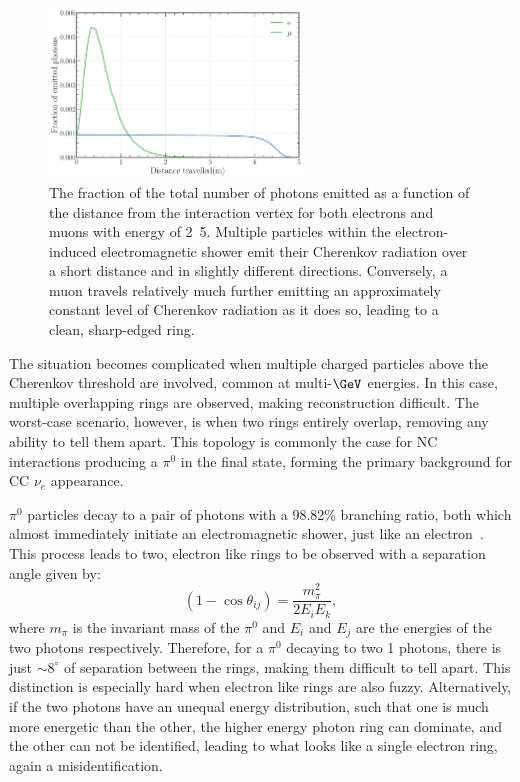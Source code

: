 \begin{figure} %
    \includegraphics[width=0.6\textwidth]{diagrams/4-chips/emission_distance.pdf}
    \caption[Fraction of Cherenkov photons emitted as a function of distance]
    {The fraction of the total number of photons emitted as a function of the distance from the
        interaction vertex for both electrons and muons with energy of \unit{2.5}{\GeV}. Multiple
        particles within the electron-induced electromagnetic shower emit their Cherenkov
        radiation over a short distance and in slightly different directions. Conversely, a muon
        travels relatively much further emitting an approximately constant level of Cherenkov
        radiation as it does so, leading to a clean, sharp-edged ring.}
    \label{fig:emission distance}
\end{figure}

The situation becomes complicated when multiple charged particles above the Cherenkov threshold
are involved, common at multi-$\GeV$ energies. In this case, multiple overlapping rings are
observed, making reconstruction difficult. The worst-case scenario, however, is when two rings
entirely overlap, removing any ability to tell them apart. This topology is commonly the case for
NC interactions producing a $\pi^{0}$ in the final state, forming the primary background for CC
$\nu_{e}$ appearance.

$\pi^{0}$ particles decay to a pair of photons with a 98.82\% branching ratio, both which almost
immediately initiate an electromagnetic shower, just like an electron~\cite{particle2020}. This
process leads to two, electron like rings to be observed with a separation angle given by:
\begin{equation}
    (1-\cos\theta_{ij})=\frac{m_{\pi}^2}{2E_{i}E_{k}},
\end{equation}
where $m_{\pi}$ is the invariant mass of the $\pi^{0}$ and $E_{i}$ and $E_{j}$ are the energies of
the two photons respectively. Therefore, for a $\pi^{0}$ decaying to two \unit{1}{\GeV} photons,
there is just $\sim 8^{\circ}$ of separation between the rings, making them difficult to tell
apart. This distinction is especially hard when electron like rings are also fuzzy. Alternatively,
if the two photons have an unequal energy distribution, such that one is much more energetic than
the other, the higher energy photon ring can dominate, and the other can not be identified,
leading to what looks like a single electron ring, again a misidentification.

